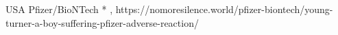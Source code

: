           {USA}
          {}
          {Pfizer/BioNTech}
          {*}
          {
            ,
          }
          {https://nomoresilence.world/pfizer-biontech/young-turner-a-boy-suffering-pfizer-adverse-reaction/}


